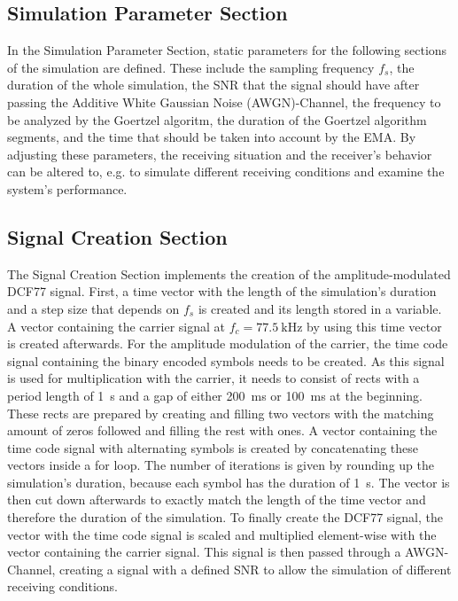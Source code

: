 \documentclass[conference]{IEEEtran}
\begin{document}
\subsection{Simulation Parameter Section}
In the Simulation Parameter Section, static parameters for the following sections of the simulation are defined.
These include the sampling frequency $f_{s}$, the duration of the whole simulation, the SNR that the signal should have after passing the Additive White Gaussian Noise (AWGN)-Channel, the frequency to be analyzed by the Goertzel algoritm, the duration of the Goertzel algorithm segments, and the time that should be taken into account by the EMA.
By adjusting these parameters, the receiving situation and the receiver's behavior can be altered to, e.g. to simulate different receiving conditions and examine the system's performance.

\subsection{Signal Creation Section}
The Signal Creation Section implements the creation of the amplitude-modulated DCF77 signal.
First, a time vector with the length of the simulation's duration and a step size that depends on $f_{s}$ is created and its length stored in a variable.
A vector containing the carrier signal at $f_{c} = \SI{77.5}{\kilo\hertz}$ by using this time vector is created afterwards.
For the amplitude modulation of the carrier, the time code signal containing the binary encoded symbols needs to be created.
As this signal is used for multiplication with the carrier, it needs to consist of rects with a period length of \SI{1}{\second} and a gap of either \SI{200}{\milli\second} or \SI{100}{\milli\second} at the beginning.
These rects are prepared by creating and filling two vectors with the matching amount of zeros followed and filling the rest with ones.
A vector containing the time code signal with alternating symbols is created by concatenating these vectors inside a for loop.
The number of iterations is given by rounding up the simulation's duration, because each symbol has the duration of \SI{1}{\second}.
The vector is then cut down afterwards to exactly match the length of the time vector and therefore the duration of the simulation.
To finally create the DCF77 signal, the vector with the time code signal is scaled and multiplied element-wise with the vector containing the carrier signal.
This signal is then passed through a AWGN-Channel, creating a signal with a defined SNR to allow the simulation of different receiving conditions.
\end{document}
